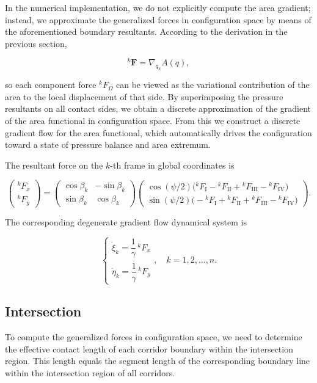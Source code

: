 \documentclass[12pt,a4paper]{article}
\theoremstyle{remark} %
\begin{document}
In the numerical implementation, we do not explicitly compute the area gradient; instead, we approximate the generalized forces in configuration space by means of the aforementioned boundary resultants. According to the derivation in the previous section,

\[
{}^{k}\mathbf F
=
\nabla_{q_k} A(q),
\]

so each component force ${}^{k}F_{\Omega}$ can be viewed as the variational contribution of the area to the local displacement of that side. By superimposing the pressure resultants on all contact sides, we obtain a discrete approximation of the gradient of the area functional in configuration space. From this we construct a discrete gradient flow for the area functional, which automatically drives the configuration toward a state of pressure balance and area extremum.

The resultant force on the $k$-th frame in global coordinates is

\[
\begin{pmatrix}
{}^{k}F_x \\ {}^{k}F_y
\end{pmatrix}
=
\begin{pmatrix}
\cos\beta_k & -\sin\beta_k \\
\sin\beta_k & \cos\beta_k
\end{pmatrix}
\begin{pmatrix}
\cos(\psi/2)\bigl({}^{k}F_{\mathrm I}-{}^{k}F_{\mathrm{II}}+{}^{k}F_{\mathrm{III}}-{}^{k}F_{\mathrm{IV}}\bigr) \\
\sin(\psi/2)\bigl(-{}^{k}F_{\mathrm I}+{}^{k}F_{\mathrm{II}}+{}^{k}F_{\mathrm{III}}-{}^{k}F_{\mathrm{IV}}\bigr)
\end{pmatrix}.
\]

The corresponding degenerate gradient flow dynamical system is

\[
\begin{cases}
\dot{\xi}_k = \dfrac{1}{\gamma} \, {}^{k}F_x \\[6pt]
\dot{\eta}_k = \dfrac{1}{\gamma} \, {}^{k}F_y
\end{cases}, \quad k=1,2,\dots,n.
\]

\subsection{Intersection}

To compute the generalized forces in configuration space, we need to determine the effective contact length of each corridor boundary within the intersection region. This length equals the segment length of the corresponding boundary line within the intersection region of all corridors.
\end{document}
